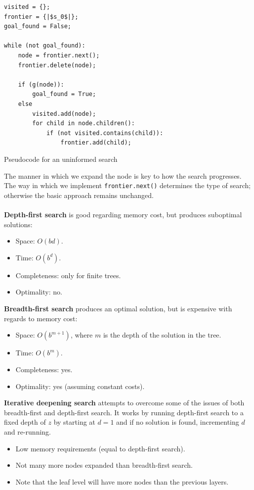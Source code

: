 \documentclass[a4paper,11pt]{article}
\newenvironment{code}{\captionsetup{type=listing}}{}
\begin{document}
\begin{code}
\begin{verbatim}
visited = {};
frontier = {|$s_0$|};
goal_found = False;

while (not goal_found):
    node = frontier.next();
    frontier.delete(node);

    if (g(node)):
        goal_found = True;
    else
        visited.add(node);
        for child in node.children():
            if (not visited.contains(child)):
                frontier.add(child);

\end{verbatim}
\caption{Pseudocode for an uninformed search}
\end{code}

The manner in which we expand the node is key to how the search progresses.
The way in which we implement \texttt{frontier.next()} determines the type of search; otherwise the basic approach remains unchanged.
\\\\
\textbf{Depth-first search} is good regarding memory cost, but produces suboptimal solutions:
\begin{itemize}
    \item   Space: $O(bd)$.
    \item   Time: $O(b^d)$.
    \item   Completeness: only for finite trees.
    \item   Optimality: no.
\end{itemize}

\textbf{Breadth-first search} produces an optimal solution, but is expensive with regards to memory cost:
\begin{itemize}
    \item   Space: $O(b^{m+1})$, where $m$ is the depth of the solution in the tree.
    \item   Time: $O(b^m)$.
    \item   Completeness: yes.
    \item   Optimality: yes (assuming constant costs).
\end{itemize}

\textbf{Iterative deepening search} attempts to overcome some of the issues of both breadth-first and depth-first search.
It works by running depth-first search to a fixed depth of $z$ by starting at $d=1$ and if no solution is found, incrementing $d$ and re-running.
\begin{itemize}
    \item   Low memory requirements (equal to depth-first search).
    \item   Not many more nodes expanded than breadth-first search.
    \item   Note that the leaf level will have more nodes than the previous layers.
\end{itemize}
\end{document}
